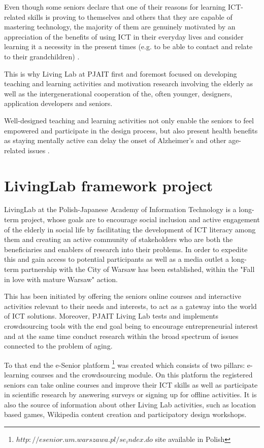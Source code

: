 \documentclass[sigconf]{acmart}
\begin{document}
Even though some seniors declare that one of their reasons for learning ICT-related skills is proving to themselves and others that they are capable of mastering technology, the majority of them are genuinely motivated by an appreciation of the benefits of using ICT in their everyday lives and consider learning it a necessity in the present times (e.g. to be able to contact and relate to their grandchildren) \cite{aula_learning_2004}.


This is why Living Lab at PJAIT first and foremost focused on developing teaching and learning activities and motivation research involving the elderly as well as the intergenerational cooperation of the, often younger, designers, application developers and seniors.

Well-designed teaching and learning activities not only enable the seniors to feel empowered and participate in the design process, but also present health benefits as staying mentally active can delay the onset of Alzheimer's and other age-related issues \cite{kotteritzsch2014adaptive}.

\section{LivingLab framework project}

LivingLab at the Polish-Japanese Academy of Information Technology is a long-term project, whose goals are to encourage social inclusion and active engagement of the elderly in social life by facilitating the development of ICT literacy among them and creating an active community of stakeholders who are both the beneficiaries and enablers of research into their problems. 
In order to expedite this and gain access to potential participants as well as a media outlet a long-term partnership with the City of Warsaw has been established, within the "Fall in love with mature Warsaw" action.

This has been initiated by offering the seniors online courses and interactive activities relevant to their needs and interests, to act as a gateway into the world of ICT solutions. Moreover, PJAIT Living Lab tests and implements crowdsourcing tools with the end goal being to encourage entrepreneurial interest and at the same time conduct research within the broad spectrum of issues connected to the problem of aging. 

To that end the e-Senior platform \footnote{$http://esenior.um.warszawa.pl/se_index.do$ site available in Polish} was created which consists of two pillars: e-learning courses and the crowdsourcing module. On this platform the registered seniors can take online courses and improve their ICT skills as well as participate in scientific research by answering surveys or signing up for offline activities. It is also the source of information about other Living Lab activities, such as location based games, Wikipedia content creation and participatory design workshops. 
\end{document}

